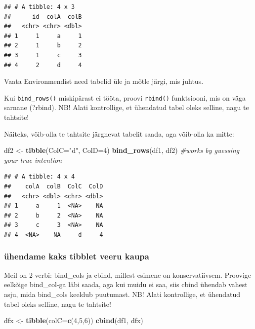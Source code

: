\documentclass[]{book}
\newenvironment{Shaded}{\begin{snugshade}}{\end{snugshade}}
\newcommand{\KeywordTok}[1]{\textcolor[rgb]{0.13,0.29,0.53}{\textbf{#1}}}
\newcommand{\DataTypeTok}[1]{\textcolor[rgb]{0.13,0.29,0.53}{#1}}
\newcommand{\DecValTok}[1]{\textcolor[rgb]{0.00,0.00,0.81}{#1}}
\newcommand{\StringTok}[1]{\textcolor[rgb]{0.31,0.60,0.02}{#1}}
\newcommand{\CommentTok}[1]{\textcolor[rgb]{0.56,0.35,0.01}{\textit{#1}}}
\newcommand{\NormalTok}[1]{#1}
\begin{document}
\begin{verbatim}
## # A tibble: 4 x 3
##      id  colA  colB
##   <chr> <chr> <dbl>
## 1     1     a     1
## 2     1     b     2
## 3     1     c     3
## 4     2     d     4
\end{verbatim}

Vaata Environmendist need tabelid üle ja mõtle järgi, mis juhtus.

Kui \texttt{bind\_rows()} miskipärast ei tööta, proovi \texttt{rbind()}
funktsiooni, mis on väga sarnane (?rbind). NB! Alati kontrollige, et
ühendatud tabel oleks selline, nagu te tahtsite!

Näiteks, võib-olla te tahtsite järgnevat tabelit saada, aga võib-olla ka
mitte:

\begin{Shaded}
\begin{Highlighting}[]
\NormalTok{df2 <-}\StringTok{ }\KeywordTok{tibble}\NormalTok{(}\DataTypeTok{ColC=}\StringTok{"d"}\NormalTok{, }\DataTypeTok{ColD=}\DecValTok{4}\NormalTok{)}
\KeywordTok{bind_rows}\NormalTok{(df1, df2) }\CommentTok{#works by guessing your true intention}
\end{Highlighting}
\end{Shaded}

\begin{verbatim}
## # A tibble: 4 x 4
##    colA  colB  ColC  ColD
##   <chr> <dbl> <chr> <dbl>
## 1     a     1  <NA>    NA
## 2     b     2  <NA>    NA
## 3     c     3  <NA>    NA
## 4  <NA>    NA     d     4
\end{verbatim}

\subsubsection{ühendame kaks tibblet veeru
kaupa}\label{uhendame-kaks-tibblet-veeru-kaupa}

Meil on 2 verbi: bind\_cols ja cbind, millest esimene on
konservatiivsem. Proovige eelkõige bind\_col-ga läbi saada, aga kui
muidu ei saa, siis cbind ühendab vahest asju, mida bind\_cols keeldub
puutumast. NB! Alati kontrollige, et ühendatud tabel oleks selline, nagu
te tahtsite!

\begin{Shaded}
\begin{Highlighting}[]
\NormalTok{dfx <-}\StringTok{ }\KeywordTok{tibble}\NormalTok{(}\DataTypeTok{colC=}\KeywordTok{c}\NormalTok{(}\DecValTok{4}\NormalTok{,}\DecValTok{5}\NormalTok{,}\DecValTok{6}\NormalTok{))}
\KeywordTok{cbind}\NormalTok{(df1, dfx)}
\end{Highlighting}
\end{Shaded}
\end{document}
